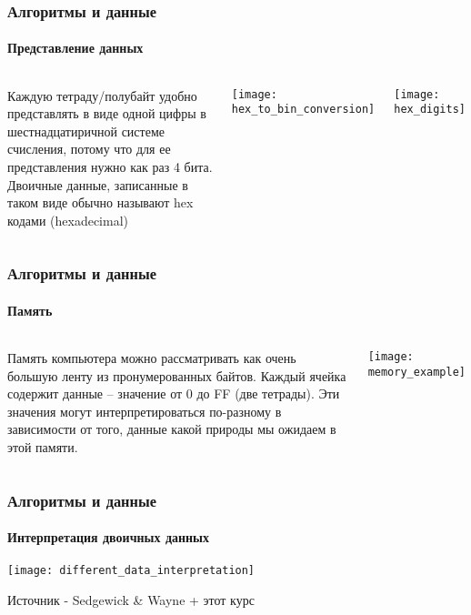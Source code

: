 \documentclass[aspectratio=169]{beamer}
\begin{document}
\begin{frame}
\frametitle{Алгоритмы и данные}
\framesubtitle{Представление данных}
\justifying
\begin{block}{}
\begin{columns}[]
\column{\dimexpr\linewidth-40mm}
\justifying
\small
Каждую тетраду/полубайт удобно представлять в виде одной цифры в шестнадцатиричной системе счисления, потому что для ее представления 
нужно как раз 4 бита. Двоичные данные, записанные в таком виде обычно называют hex кодами (hexadecimal)\newline

\centering
\texttt{[image: hex\_to\_bin\_conversion]}
\centering

\column{40mm}

\texttt{[image: hex\_digits]}
\centering

\end{columns}
\end{block}
\end{frame}

\begin{frame}
\frametitle{Алгоритмы и данные}
\framesubtitle{Память}
\justifying
\begin{block}{}
\begin{columns}[]
\column{\dimexpr\linewidth-50mm}
\justifying
\normalsize

Память компьютера можно рассматривать как очень большую ленту из пронумерованных байтов. Каждый ячейка содержит данные – значение от 0 до FF (две тетрады). \newline\newline Эти значения могут интерпретироваться по-разному в зависимости от того, данные какой природы мы ожидаем в этой памяти.

\centering

\column{50mm}

\texttt{[image: memory\_example]}
\centering

\end{columns}
\end{block}
\end{frame}

\begin{frame}
\frametitle{Алгоритмы и данные}
\framesubtitle{Интерпретация двоичных данных}
\justifying
\small
\centering
\texttt{[image: different\_data\_interpretation]}

\scriptsize Источник - Sedgewick \& Wayne + этот курс

\end{frame}
\end{document}
